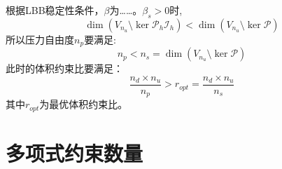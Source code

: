 根据LBB稳定性条件，$\beta$为……。$\beta_s>0$时,
\begin{equation}
    \dim(V_{n_u}\setminus\ker \mathcal P_h \mathcal I_h) < \dim(V_{n_u}\setminus \ker \mathcal P)
\end{equation}
所以压力自由度$n_p$要满足:
\begin{equation}
    n_p<n_s = \dim(V_{n_u}\setminus \ker \mathcal P)
\end{equation}
此时的体积约束比要满足：
\begin{equation}
\frac{n_d\times n_u}{n_p}>r_{opt}=\frac{n_d\times n_u}{n_s}
\end{equation}
其中$r_{opt}$为最优体积约束比。
\section{多项式约束数量}

